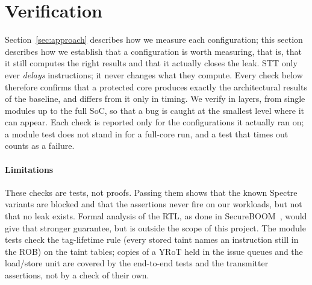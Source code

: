 \section{Verification}
\label{sec:verification}


Section~\ref{sec:approach} describes how we measure each configuration; this
section describes how we establish that a configuration is worth measuring,
that is, that it still computes the right results and that it actually closes
the leak. STT only ever \emph{delays} instructions; it never changes what they
compute. Every check below therefore confirms that a protected core produces
exactly the architectural results of the baseline, and differs from it only in
timing. We verify in layers, from single modules up to the full SoC, so that a
bug is caught at the smallest level where it can appear. Each check is
reported only for the configurations it actually ran on; a module test does
not stand in for a full-core run, and a test that times out counts as a
failure.






\paragraph{Limitations}
These checks are tests, not proofs. Passing them shows that the known Spectre
variants are blocked and that the assertions never fire on our workloads, but
not that no leak exists. Formal analysis of the RTL, as done in
SecureBOOM~\cite{Jauch:SecureBOOM:2023}, would give that stronger guarantee,
but is outside the scope of this project. The module tests check the
tag-lifetime rule (every stored taint names an instruction still in the ROB)
on the taint tables; copies of a YRoT held in the issue queues and the
load/store unit are covered by the end-to-end tests and the transmitter
assertions, not by a check of their own.
